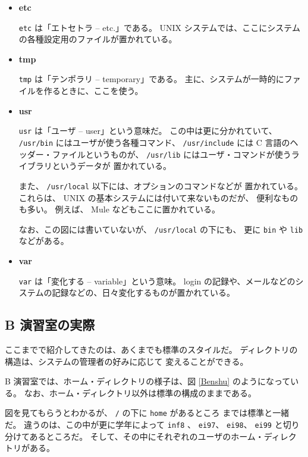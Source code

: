 \begin{itemize}
 \texttt{/} の下の \texttt{bin}、つまり \texttt{/bin} には、
 UNIX システムの一番基本的なコマンドが置いてある。

\item \textbf{\large etc}

 \texttt{etc} は「エトセトラ -- etc.」である。
 UNIX システムでは、ここにシステムの各種設定用のファイルが置かれている。

\item \textbf{\large tmp}

 \texttt{tmp} は「テンポラリ -- temporary」である。
主に、システムが一時的にファイルを作るときに、ここを使う。

\item \textbf{\large usr}

 \texttt{usr} は「ユーザ -- user」という意味だ。
この中は更に分かれていて、 \texttt{/usr/bin} にはユーザが使う各種コマンド、
 \texttt{/usr/include} には C 言語のヘッダー・ファイルというものが、
 \texttt{/usr/lib} にはユーザ・コマンドが使うライブラリというデータが
置かれている。

また、 \texttt{/usr/local} 以下には、オプションのコマンドなどが
置かれている。
これらは、 UNIX の基本システムには付いて来ないものだが、
便利なものも多い。
例えば、 Mule などもここに置かれている。

なお、この図には書いていないが、 \texttt{/usr/local} の下にも、
更に \texttt{bin} や \texttt{lib} などがある。

\item \textbf{\large var}

 \texttt{var} は「変化する -- variable」という意味。
 login の記録や、メールなどのシステムの記録などの、日々変化するものが置かれている。
\end{itemize}

\newpage

\subsection{B 演習室の実際}

ここまでで紹介してきたのは、あくまでも標準のスタイルだ。
ディレクトリの構造は、システムの管理者の好みに応じて
変えることができる。

B 演習室では、ホーム・ディレクトリの様子は、図 \ref{Benshu} のようになっている。
なお、ホーム・ディレクトリ以外は標準の構成のままである。

図を見てもらうとわかるが、 \texttt{/} の下に \texttt{home} があるところ
までは標準と一緒だ。
違うのは、この中が更に学年によって \texttt{inf8} 、
 \texttt{ei97}、 \texttt{ei98}、 \texttt{ei99} と切り分けてあるところだ。
そして、その中にそれぞれのユーザのホーム・ディレクトリがある。

